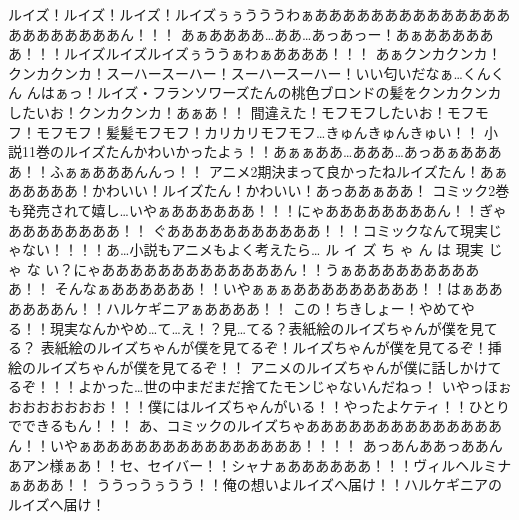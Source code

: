 %

ルイズ！ルイズ！ルイズ！ルイズぅぅうううわぁああああああああああああああああああああああん！！！
 あぁああああ…ああ…あっあっー！あぁああああああ！！！ルイズルイズルイズぅううぁわぁああああ！！！
 あぁクンカクンカ！クンカクンカ！スーハースーハー！スーハースーハー！いい匂いだなぁ…くんくん
 んはぁっ！ルイズ・フランソワーズたんの桃色ブロンドの髪をクンカクンカしたいお！クンカクンカ！あぁあ！！
 間違えた！モフモフしたいお！モフモフ！モフモフ！髪髪モフモフ！カリカリモフモフ…きゅんきゅんきゅい！！
 小説11巻のルイズたんかわいかったよぅ！！あぁぁああ…あああ…あっあぁああああ！！ふぁぁあああんんっ！！
 アニメ2期決まって良かったねルイズたん！あぁあああああ！かわいい！ルイズたん！かわいい！あっああぁああ！
 コミック2巻も発売されて嬉し…いやぁああああああ！！！にゃああああああああん！！ぎゃああああああああ！！
 ぐあああああああああああ！！！コミックなんて現実じゃない！！！！あ…小説もアニメもよく考えたら…
 ル イ ズ ち ゃ ん は 現実 じ ゃ な い？にゃあああああああああああああん！！うぁああああああああああ！！
 そんなぁああああああ！！いやぁぁぁあああああああああ！！はぁああああああん！！ハルケギニアぁああああ！！
 この！ちきしょー！やめてやる！！現実なんかやめ…て…え！？見…てる？表紙絵のルイズちゃんが僕を見てる？
 表紙絵のルイズちゃんが僕を見てるぞ！ルイズちゃんが僕を見てるぞ！挿絵のルイズちゃんが僕を見てるぞ！！
 アニメのルイズちゃんが僕に話しかけてるぞ！！！よかった…世の中まだまだ捨てたモンじゃないんだねっ！
 いやっほぉおおおおおおお！！！僕にはルイズちゃんがいる！！やったよケティ！！ひとりでできるもん！！！
 あ、コミックのルイズちゃああああああああああああああん！！いやぁあああああああああああああああ！！！！
 あっあんああっああんあアン様ぁあ！！セ、セイバー！！シャナぁああああああ！！！ヴィルヘルミナぁあああ！！
 ううっうぅうう！！俺の想いよルイズへ届け！！ハルケギニアのルイズへ届け！
